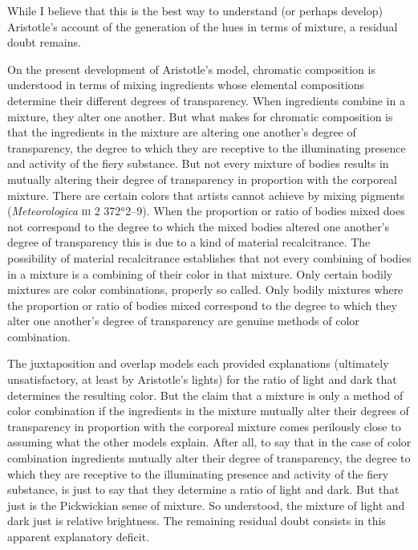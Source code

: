 While I believe that this is the best way to understand (or perhaps develop) Aristotle's account of the generation of the hues in terms of mixture, a residual doubt remains. 

On the present development of Aristotle's model, chromatic composition is understood in terms of mixing ingredients whose elemental compositions determine their different degrees of transparency. When ingredients combine in a mixture, they alter one another. But what makes for chromatic composition is that the ingredients in the mixture are altering one another's degree of transparency, the degree to which they are receptive to the illuminating presence and activity of the fiery substance. But not every mixture of bodies results in mutually altering their degree of transparency in proportion with the corporeal mixture. There are certain colors that artists cannot achieve by mixing pigments (\emph{Meteorologica} \textsc{iii} 2 372\( ^{a} \)2--9). When the proportion or ratio of bodies mixed does not correspond to the degree to which the mixed bodies altered one another's degree of transparency this is due to a kind of material recalcitrance. The possibility of material recalcitrance establishes that not every combining of bodies in a mixture is a combining of their color in that mixture. Only certain bodily mixtures are color combinations, properly so called. Only bodily mixtures where the proportion or ratio of bodies mixed correspond to the degree to which they alter one another's degree of transparency are genuine methods of color combination.

The juxtaposition and overlap models each provided explanations (ultimately unsatisfactory, at least by Aristotle's lights) for the ratio of light and dark that determines the resulting color. But the claim that a mixture is only a method of color combination if the ingredients in the mixture mutually alter their degrees of transparency in proportion with the corporeal mixture comes perilously close to assuming what the other models explain. After all, to say that in the case of color combination ingredients mutually alter their degree of transparency, the degree to which they are receptive to the illuminating presence and activity of the fiery substance, is just to say that they determine a ratio of light and dark. But that just is the Pickwickian sense of mixture. So understood, the mixture of light and dark just is relative brightness. The remaining residual doubt consists in this apparent explanatory deficit. 


